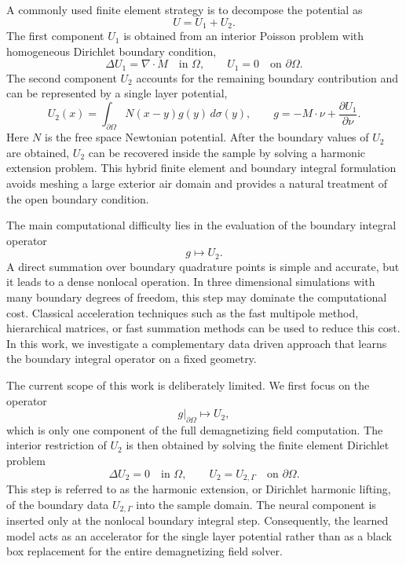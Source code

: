 \documentclass[11pt]{article}
\numberwithin{equation}{section}
\begin{document}
A commonly used finite element strategy is to decompose the potential as
\begin{equation}
    U = U_1 + U_2.
\end{equation}
The first component \(U_1\) is obtained from an interior Poisson problem with homogeneous Dirichlet boundary condition,
\begin{equation}
    \Delta U_1 = \nabla \cdot M
    \quad \text{in } \Omega,
    \qquad
    U_1 = 0
    \quad \text{on } \partial\Omega.
\end{equation}
The second component \(U_2\) accounts for the remaining boundary contribution and can be represented by a single layer potential,
\begin{equation}
    U_2(x)
    =
    \int_{\partial\Omega}
    N(x-y) g(y)\,d\sigma(y),
    \qquad
    g = -M\cdot\nu + \frac{\partial U_1}{\partial\nu}.
    \label{eq:intro_single_layer}
\end{equation}
Here \(N\) is the free space Newtonian potential. After the boundary values of \(U_2\) are obtained, \(U_2\) can be recovered inside the sample by solving a harmonic extension problem. This hybrid finite element and boundary integral formulation avoids meshing a large exterior air domain and provides a natural treatment of the open boundary condition.

The main computational difficulty lies in the evaluation of the boundary integral operator
\begin{equation}
    g \longmapsto U_2.
\end{equation}
A direct summation over boundary quadrature points is simple and accurate, but it leads to a dense nonlocal operation. In three dimensional simulations with many boundary degrees of freedom, this step may dominate the computational cost. Classical acceleration techniques such as the fast multipole method, hierarchical matrices, or fast summation methods can be used to reduce this cost. In this work, we investigate a complementary data driven approach that learns the boundary integral operator on a fixed geometry.

The current scope of this work is deliberately limited. We first focus on the operator
\begin{equation}
    g|_{\partial\Omega}
    \longmapsto
    U_2,
    \label{eq:intro_boundary_operator}
\end{equation}
which is only one component of the full demagnetizing field computation. The interior restriction of \(U_2\) is then obtained by solving the finite element Dirichlet problem
\begin{equation}
    \Delta U_2 = 0
    \quad \text{in } \Omega,
    \qquad
    U_2 = U_{2,\Gamma}
    \quad \text{on } \partial\Omega.
    \label{eq:u2_harmonic_extension}
\end{equation}
This step is referred to as the harmonic extension, or Dirichlet harmonic lifting, of the boundary data \(U_{2,\Gamma}\) into the sample domain. The neural component is inserted only at the nonlocal boundary integral step. Consequently, the learned model acts as an accelerator for the single layer potential rather than as a black box replacement for the entire demagnetizing field solver.
\end{document}
